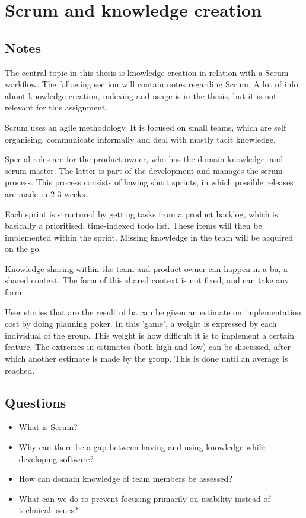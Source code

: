 \section{Scrum and knowledge creation \cite{van2012scrum}}
\subsection{Notes}
The central topic in this thesis is knowledge creation in relation with a Scrum workflow.
The following section will contain notes regarding Scrum.
A lot of info about knowledge creation, indexing and usage is in the thesis, but it is not relevant for this assignment.

Scrum uses an agile methodology. 
It is focused on small teams, which are self organising, communicate informally and deal with mostly tacit knowledge. 

Special roles are for the product owner, who has the domain knowledge, and scrum master. 
The latter is part of the development and manages the scrum process.
This process consists of having short sprints, in which possible releases are made in 2-3 weeks. 

Each sprint is structured by getting tasks from a product backlog, which is basically a prioritised, time-indexed todo list. 
These items will then be implemented within the sprint.
Missing knowledge in the team will be acquired on the go. 

Knowledge sharing within the team and product owner can happen in a ba, a shared context.
The form of this shared context is not fixed, and can take any form.

User stories that are the result of ba can be given an estimate on implementation cost by doing planning poker.
In this 'game', a weight is expressed by each individual of the group.
This weight is how difficult it is to implement a certain feature. 
The extremes in estimates (both high and low) can be discussed, after which another estimate is made by the group. 
This is done until an average is reached. 


\subsection{Questions}
\begin{itemize}
  \item What is Scrum?
  \item Why can there be a gap between having and using knowledge while developing software?
  \item How can domain knowledge of team members be assessed?
  \item What can we do to prevent focusing primarily on usability instead of technical issues?
\end{itemize}
